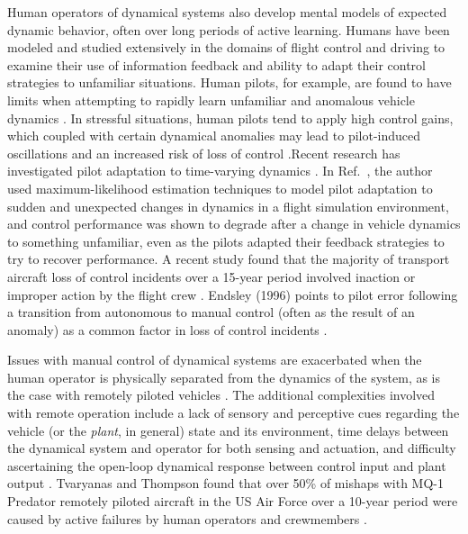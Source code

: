 Human operators of dynamical systems also develop mental models of expected dynamic behavior, often over long periods of active learning. Humans have been modeled and studied extensively in the domains of flight control \cite{hess2015modeling, zaal2016manual, mcruer1967review, phatak1969model} and driving \cite{macadam2003understanding} to examine their use of information feedback and ability to adapt their control strategies to unfamiliar situations. Human pilots, for example, are found to have limits when attempting to rapidly learn unfamiliar and anomalous vehicle dynamics \cite{hess2012modeling, hess2015modeling, endsley1995toward, zaal2016manual, oliver2017cognition}. In stressful situations, human pilots tend to apply high control gains, which coupled with certain dynamical anomalies may lead to pilot-induced oscillations and an increased risk of loss of control \cite{hess1997unified}.Recent research has investigated pilot adaptation to time-varying dynamics \cite{hess2009modeling, hess2015modeling, zaal2011estimation}. In  Ref.~\cite{zaal2016manual}, the author used maximum-likelihood estimation techniques to model pilot adaptation to sudden and unexpected changes in dynamics in a flight simulation environment, and control performance was shown to degrade after a change in vehicle dynamics to something unfamiliar, even as the pilots adapted their feedback strategies to try to recover performance. A recent study found that the majority of transport aircraft loss of control incidents over a 15-year period involved inaction or improper action by the flight crew \cite{belcastro2014preliminary}. Endsley (1996) points to pilot error following a transition from autonomous to manual control (often as the result of an anomaly) as a common factor in loss of control incidents \cite{endsley1996automation}. 

Issues with manual control of dynamical systems are exacerbated when the human operator is physically separated from the dynamics of the system, as is the case with remotely piloted vehicles \cite{mccarley2004human, tvaryanas2008recurrent}. The additional complexities involved with remote operation include a lack of sensory and perceptive cues regarding the vehicle (or the \textit{plant}, in general) state and its environment, time delays between the dynamical system and operator for both sensing and actuation, and difficulty ascertaining the open-loop dynamical response between control input and plant output \cite{lam2009artificial, lam2008haptic}. Tvaryanas and Thompson found that over 50\% of mishaps with MQ-1 Predator remotely piloted aircraft in the US Air Force over a 10-year period were caused by active failures by human operators and crewmembers \cite{tvaryanas2008recurrent}. 

